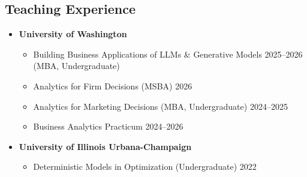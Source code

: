 \documentclass[margin,line]{resume}
\begin{document}
\begin{resume}
 \section{\mysidestyle Teaching Experience} 
 \begin{itemize}[topsep=-5mm, leftmargin=0mm]
     \item [] \textbf{University of Washington}
     \begin{itemize}
         \item [] Building Business Applications of LLMs \& Generative Models \hfill 2025--2026\\
             (MBA, Undergraduate)
         \item [] Analytics for Firm Decisions (MSBA) \hfill 2026
         \item [] Analytics for Marketing Decisions (MBA, Undergraduate) \hfill 2024--2025
         \item [] Business Analytics Practicum \hfill 2024--2026
     \end{itemize}
     \item [] \textbf{University of Illinois Urbana-Champaign}
     \begin{itemize}
         \item [] Deterministic Models in Optimization (Undergraduate) \hfill 2022
     \end{itemize}
 \end{itemize}


\end{resume}
\end{document}
